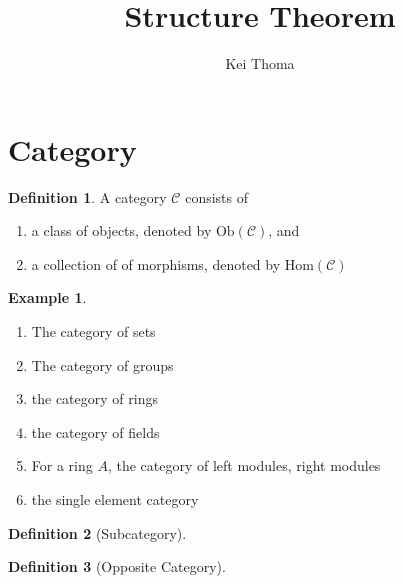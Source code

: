 \documentclass[a4paper]{scrartcl}
\title{Structure Theorem}
\author{Kei Thoma}
\theoremstyle{definition}
\newtheorem{definition}{Definition}[]
\newtheorem{example}{Example}[definition]
\begin{document}
\maketitle

\section{Category}
\begin{defbox}
  \begin{definition}
    A category \(\mathcal{C}\) consists of
    \begin{enumerate}
      \item a class of objects, denoted by \(\mathrm{Ob}(\mathcal{C})\), and
      \item a collection of of morphisms, denoted by \(\mathrm{Hom}(\mathcal{C})\)
    \end{enumerate}
  \end{definition}
\end{defbox}

\begin{exmbox}
  \begin{example}
    \begin{enumerate}
      \item The category of sets
      \item The category of groups
      \item the category of rings
      \item the category of fields
      \item For a ring \(A\), the category of left modules, right modules
      \item the single element category
    \end{enumerate}
  \end{example}
\end{exmbox}

\begin{defbox}
  \begin{definition}[Subcategory]
    
  \end{definition}
\end{defbox}

\begin{defbox}
  \begin{definition}[Opposite Category]
    
  \end{definition}
\end{defbox}
\end{document}
